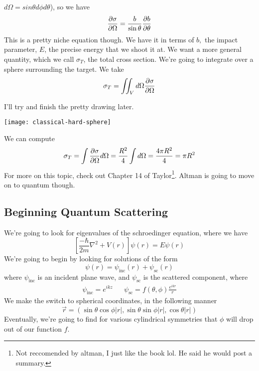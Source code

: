 \documentclass{article}
\theoremstyle{definition}
\begin{document}
$d\Omega=sin\theta d\phi d\theta$), so we have \begin{equation} \pdv{\sigma}{\Omega}=\frac{b}{\sin\theta}\pdv{b}{\theta} \end{equation} This is a pretty niche equation though. We have it in terms of $b,$ the impact parameter, $E$, the precise energy that we shoot it at. We want a more general quantity, which we call $\sigma_T$, the total cross section. We're going to integrate over a sphere surrounding the target. We take \begin{equation} \sigma_T=\iint_Vd\Omega\pdv{\sigma}{\Omega} \end{equation} \begin{center}  \end{center} I'll try and finish the pretty drawing later. \begin{center} \texttt{[image: classical-hard-sphere]} \end{center} We can compute \begin{equation} \sigma_T=\int\pdv{\sigma}{\Omega}d\Omega=\frac{R^2}{4}\int d\Omega=\frac{4\pi R^2}{4}=\pi R^2 \end{equation} For more on this topic, check out Chapter 14 of Taylor\footnote{Not reccomended by altman, I just like the book lol. He said he would post a summary.}. Altman is going to move on to quantum though. \subsection{Beginning Quantum Scattering} We're going to look for eigenvalues of the schroedinger equation, where we have \begin{equation} \left[\frac{-\hbar}{2m}\nabla^2+V(r)\right]\psi(r)=E\psi(r) \end{equation} We're going to begin by looking for solutions of the form \begin{equation} \psi(r)=\psi_\mathrm{inc}(r)+\psi_\mathrm{sc}(r) \end{equation} where $\psi_\mathrm{inc}$ is an incident plane wave, and $\psi_\mathrm{sc}$ is the scattered component, where \begin{align} \psi_\mathrm{inc}=e^{ikz} && \psi_\mathrm{sc}=f(\theta,\phi)\frac{e^{ikr}}{r} \end{align} We make the switch to spherical coordinates, in the following manner \begin{equation} \vec{r}=(\sin\theta\cos\phi|r|,\sin\theta\sin\phi|r|,\cos\theta|r|) \end{equation} Eventually, we're going to find for various cylindrical symmetries that $\phi$ will drop out of our function $f$.
\end{document}
